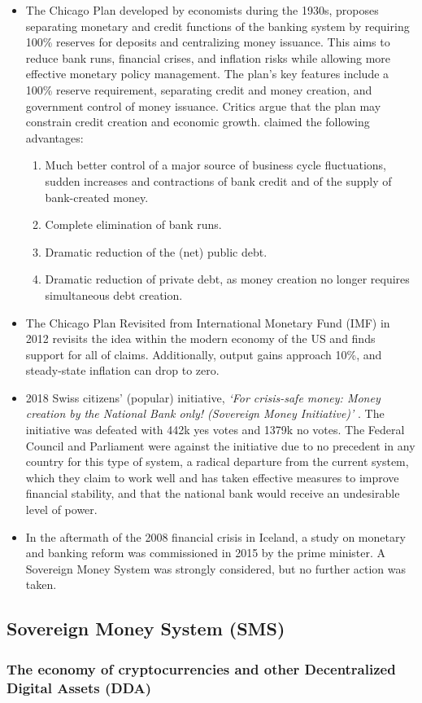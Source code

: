 \begin{itemize}
    \item The Chicago Plan \cite{fisher1936} developed by economists during the 1930s, proposes separating monetary and credit functions of the banking system by requiring 100\% reserves for deposits and centralizing money issuance. This aims to reduce bank runs, financial crises, and inflation risks while allowing more effective monetary policy management. The plan's key features include a 100\% reserve requirement, separating credit and money creation, and government control of money issuance. Critics argue that the plan may constrain credit creation and economic growth. \textcite{fisher1936} claimed the following advantages:
    \begin{enumerate}
        \item Much better control of a major source of business cycle fluctuations, sudden increases and contractions of bank credit and of the supply of bank-created money.
        \item Complete elimination of bank runs.
        \item Dramatic reduction of the (net) public debt.
        \item Dramatic reduction of private debt, as money creation no longer requires simultaneous debt creation.
        \end{enumerate}
        \item The Chicago Plan Revisited \cite{chicagorevisited} from International Monetary Fund (IMF) in 2012 revisits the idea within the modern economy of the US and finds support for all of \textcite{fisher1936} claims. Additionally, output gains approach 10\%, and steady-state inflation can drop to zero.
        \item 2018 Swiss citizens’ (popular) initiative, \textit{‘For crisis-safe money: Money creation by the National Bank only! (Sovereign Money Initiative)’} \cite{SwizzInitiative}. The initiative was defeated with 442k yes votes and 1379k no votes. The Federal Council and Parliament were against the initiative due to no precedent in any country for this type of system, a radical departure from the current system, which they claim to work well and has taken effective measures to improve financial stability, and that the national bank would receive an undesirable level of power.
        \item In the aftermath of the 2008 financial crisis in Iceland, a study on monetary and banking reform \cite{IcelandReport} was commissioned in 2015 by the prime minister. A Sovereign Money System was strongly considered, but no further action was taken.
\end{itemize}

\subsection{Sovereign Money System (SMS)}

\subsubsection{The economy of cryptocurrencies and other Decentralized Digital Assets (DDA)}
